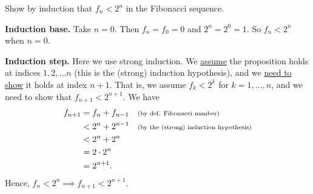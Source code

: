 \documentclass[10pt]{beamer}
\begin{document}
\begin{frame}
\small 
\begin{mygreenbox}[title=Exercise 4]
Show by induction that $f_n < 2^n$ in the Fibonacci sequence. 
\end{mygreenbox}

\vfill \vfill 
\begin{myyellowbox}[title=Solution]
\textbf{Induction base.} Take $n=0$.  Then $f_n = f_0 = 0$  and  $2^n =2^0 =1$. So $f_n < 2^n$ when $n=0$.

\vspace{0.25cm}

\textbf{Induction step.} Here we use strong induction. We \underline{assume} the proposition holds at indices $1, 2, \hdots n$ (this is the \alert{(strong) induction hypothesis}), and we \underline{need to show} it holds at index $n+1$.  That is, we assume $f_k < 2^k$ for $k=1,\hdots, n$, and we need to show that $f_{n+1} < 2^{n+1}$.  We have
%
\begin{align*}
f_{n+1} &= f_n + f_{n-1} && \text{\scriptsize{{(by def. Fibonacci number)}}}	\\
&< 2^n + 2^{n-1} && \text{\scriptsize{{(by the (strong) induction hypothesis)}}} \\
&< 2^n + 2^n  && \\
&= 2 \cdot 2^n  \\
&= 2^{n+1}.
\end{align*}
Hence, $f_n < 2^n \implies f_{n+1} < 2^{n+1}$.
\end{myyellowbox}
	
\end{frame}
\end{document}
